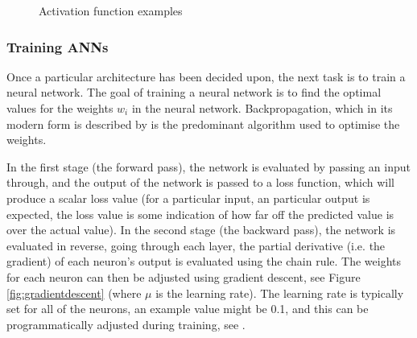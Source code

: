         \begin{figure}[h]
            \centering


        \caption{Activation function examples}
        \label{fig:activationeg}    
    \end{figure}

          \subsubsection{Training ANNs}
          Once a particular architecture has been decided upon, the next task is to train a neural network. The goal of training a neural network is to find the optimal values for the weights $w_i$ in the neural network. Backpropagation, which in its modern form is described by \cite{rumelhart1988learning} is the predominant algorithm used to optimise the weights.

          In the first stage (the forward pass), the network is evaluated by passing an input through, and the output of the network is passed to a loss function, which will produce a scalar loss value (for a particular input, an particular output is expected, the loss value is some indication of how far off the predicted value is over the actual value). In the second stage (the backward pass), the network is evaluated in reverse, going through each layer, the partial derivative (i.e. the gradient) of each neuron's output is evaluated using the chain rule. The weights for each neuron can then be adjusted using gradient descent, see Figure \ref{fig:gradientdescent} (where $\mu$ is the learning rate). The learning rate is typically set for all of the neurons, an example value might be 0.1, and this can be programmatically adjusted during training, see \cite{learningratetypes}.

